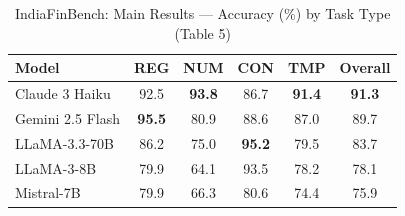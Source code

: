 \begin{table}[h]
\centering
\caption{IndiaFinBench: Main Results --- Accuracy (\%) by Task Type (Table 5)}
\label{tab:main_results}
\begin{tabular}{lccccc}
\toprule
Model & REG & NUM & CON & TMP & Overall \\
\midrule
Claude 3 Haiku & 92.5 & \textbf{93.8} & 86.7 & \textbf{91.4} & \textbf{91.3} \\
Gemini 2.5 Flash & \textbf{95.5} & 80.9 & 88.6 & 87.0 & 89.7 \\
LLaMA-3.3-70B & 86.2 & 75.0 & \textbf{95.2} & 79.5 & 83.7 \\
LLaMA-3-8B & 79.9 & 64.1 & 93.5 & 78.2 & 78.1 \\
Mistral-7B & 79.9 & 66.3 & 80.6 & 74.4 & 75.9 \\
\bottomrule
\end{tabular}
\end{table}
